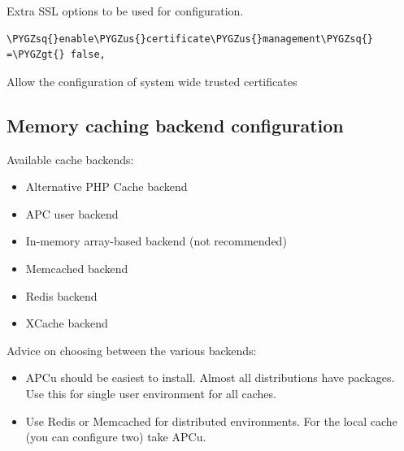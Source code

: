 \documentclass[letterpaper,10pt,english]{sphinxmanual}
\def\PYGZus{\char`\_}
\def\PYGZgt{\char`\>}
\def\PYGZsq{\char`\'}
\renewcommand\PYGZsq{\textquotesingle}
\begin{document}
Extra SSL options to be used for configuration.

\begin{Verbatim}[commandchars=\\\{\}]
\PYGZsq{}enable\PYGZus{}certificate\PYGZus{}management\PYGZsq{} =\PYGZgt{} false,
\end{Verbatim}

Allow the configuration of system wide trusted certificates


\subsection{Memory caching backend configuration}
\label{configuration_server/config_sample_php_parameters:memory-caching-backend-configuration}
Available cache backends:
\begin{itemize}
\item {} 
        Alternative PHP Cache backend

\item {} 
       APC user backend

\item {} 
 In-memory array-based backend (not recommended)

\item {} 
  Memcached backend

\item {} 
      Redis backend

\item {} 
     XCache backend

\end{itemize}

Advice on choosing between the various backends:
\begin{itemize}
\item {} 
APCu should be easiest to install. Almost all distributions have packages.
Use this for single user environment for all caches.

\item {} 
Use Redis or Memcached for distributed environments.
For the local cache (you can configure two) take APCu.

\end{itemize}
\end{document}
